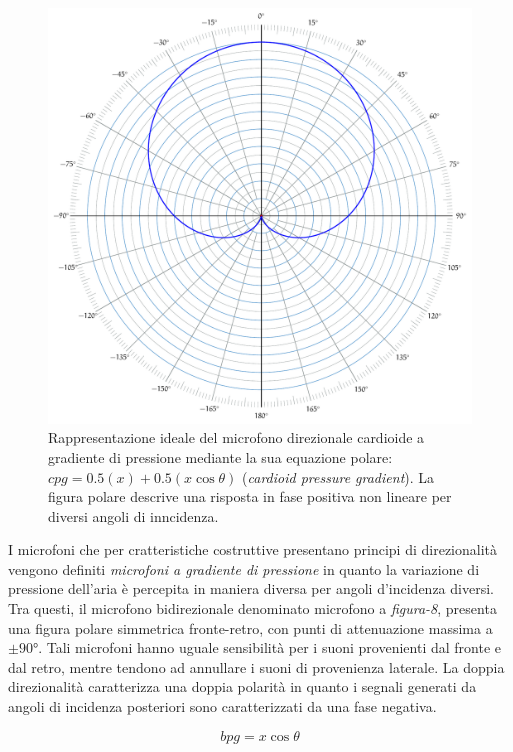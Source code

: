 \begin{figure}[t]
\centering
\includegraphics[width=0.99\columnwidth]{CAPITOLI/_TIKZ/POLAR/cardioid}
\caption{Rappresentazione ideale del microfono direzionale cardioide a gradiente
di pressione mediante la sua equazione polare: $cpg = 0.5(x) + 0.5(x\cos\theta)$
(\emph{cardioid pressure gradient}). La figura polare descrive una risposta in
fase positiva non lineare per diversi angoli di inncidenza.}
\label{polar:cardioid}
\end{figure}

I microfoni che per cratteristiche costruttive presentano principi di direzionalità
vengono definiti \emph{microfoni a gradiente di pressione} in quanto la variazione
di pressione dell'aria è percepita in maniera diversa per angoli d'incidenza diversi.
Tra questi, il microfono bidirezionale denominato microfono a \emph{figura-8},
presenta una figura polare simmetrica fronte-retro, con punti di attenuazione
massima a $\pm90°$. Tali microfoni hanno uguale sensibilità per i suoni
provenienti dal fronte e dal retro, mentre tendono ad annullare i suoni di
provenienza laterale. La doppia direzionalità caratterizza una doppia polarità
in quanto i segnali generati da angoli di incidenza posteriori sono caratterizzati da
una fase negativa.

\begin{equation}
bpg = x\cos\theta
\label{eq:fig8}
\end{equation}

